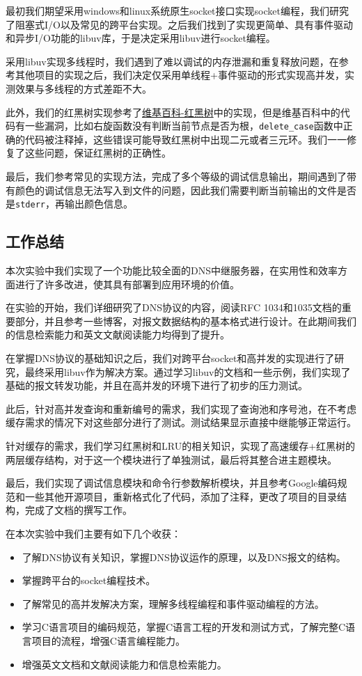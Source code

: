 \documentclass[lang=cn,11pt,a4paper,cite=authornum]{paper}
\begin{document}
最初我们期望采用windows和linux系统原生socket接口实现socket编程，我们研究了阻塞式I/O以及常见的跨平台实现。之后我们找到了实现更简单、具有事件驱动和异步I/O功能的libuv库，于是决定采用libuv进行socket编程。

采用libuv实现多线程时，我们遇到了难以调试的内存泄漏和重复释放问题，在参考其他项目的实现之后，我们决定仅采用单线程+事件驱动的形式实现高并发，实测效果与多线程的方式差距不大。

此外，我们的红黑树实现参考了\href{https://zh.wikipedia.org/wiki/%E7%BA%A2%E9%BB%91%E6%A0%91}{维基百科-红黑树}中的实现，但是维基百科中的代码有一些漏洞，比如右旋函数没有判断当前节点是否为根，\texttt{delete_case}函数中正确的代码被注释掉，这些错误可能导致红黑树中出现二元或者三元环。我们一一修复了这些问题，保证红黑树的正确性。

最后，我们参考常见的实现方法，完成了多个等级的调试信息输出，期间遇到了带有颜色的调试信息无法写入到文件的问题，因此我们需要判断当前输出的文件是否是\texttt{stderr}，再输出颜色信息。

\subsection{工作总结}

本次实验中我们实现了一个功能比较全面的DNS中继服务器，在实用性和效率方面进行了许多改进，使其具有部署到应用环境的价值。

在实验的开始，我们详细研究了DNS协议的内容，阅读RFC 1034和1035文档的重要部分，并且参考一些博客，对报文数据结构的基本格式进行设计。在此期间我们的信息检索能力和英文文献阅读能力均得到了提升。

在掌握DNS协议的基础知识之后，我们对跨平台socket和高并发的实现进行了研究，最终采用libuv作为解决方案。通过学习libuv的文档和一些示例，我们实现了基础的报文转发功能，并且在高并发的环境下进行了初步的压力测试。

此后，针对高并发查询和重新编号的需求，我们实现了查询池和序号池，在不考虑缓存需求的情况下对这些部分进行了测试。测试结果显示直接中继能够正常运行。

针对缓存的需求，我们学习红黑树和LRU的相关知识，实现了高速缓存+红黑树的两层缓存结构，对于这一个模块进行了单独测试，最后将其整合进主题模块。

最后，我们实现了调试信息模块和命令行参数解析模块，并且参考Google编码规范和一些其他开源项目，重新格式化了代码，添加了注释，更改了项目的目录结构，完成了文档的撰写工作。

在本次实验中我们主要有如下几个收获：

\begin{itemize}
    \item 了解DNS协议有关知识，掌握DNS协议运作的原理，以及DNS报文的结构。
    \item 掌握跨平台的socket编程技术。
    \item 了解常见的高并发解决方案，理解多线程编程和事件驱动编程的方法。
    \item 学习C语言项目的编码规范，掌握C语言工程的开发和测试方式，了解完整C语言项目的流程，增强C语言编程能力。
    \item 增强英文文档和文献阅读能力和信息检索能力。
\end{itemize}
\end{document}
